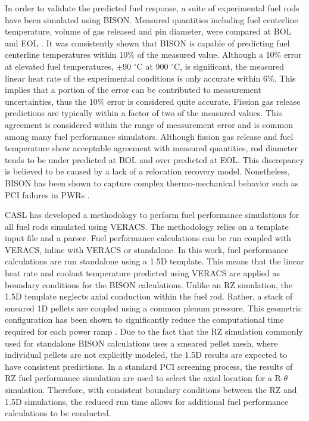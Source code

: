 \documentclass[edeposit,fullpage,11pt]{uiucthesis2009}
\begin{document}
In order to validate the predicted fuel response, a suite of experimental fuel rods have been simulated using BISON.
Measured quantities including fuel centerline temperature, volume of gas released and pin diameter, were compared at \gls{BOL} and \gls{EOL} \cite{williamson_validating_2016}.
It was consistently shown that BISON is capable of predicting fuel centerline temperatures within 10\% of the measured value.
Although a 10\% error at elevated fuel temperatures, $\pm$90 $^\circ$C at 900 $^\circ$C, is significant, the measured linear heat rate of the experimental conditions is only accurate within 6\%. 
This implies that a portion of the error can be contributed to measurement uncertainties, thus the 10\% error is considered quite accurate.
Fission gas release predictions are typically within a factor of two of the measured values.
This agreement is considered within the range of measurement error and is common among many fuel performance simulators.
Although fission gas release and fuel temperature show acceptable agreement with measured quantities, rod diameter tends to be under predicted at \gls{BOL} and over predicted at \gls{EOL}.
This discrepancy is believed to be caused by a lack of a relocation recovery model.
Nonetheless, BISON has been shown to capture complex thermo-mechanical behavior such as PCI failures in PWRs \cite{montgomery_advanced_2014,capps_pci_2017}.

\gls{CASL} has developed a methodology to perform fuel performance simulations for all fuel rods simulated using \gls{VERACS}.
The methodology relies on a template input file and a parser.
Fuel performance calculations can be run coupled with \gls{VERACS}, inline with \gls{VERACS} or standalone.
In this work, fuel performance calculations are run standalone using a 1.5D template.
This means that the linear heat rate and coolant temperature predicted using \gls{VERACS} are applied as boundary conditions for the BISON calculations.
Unlike an RZ simulation, the 1.5D template neglects axial conduction within the fuel rod.
Rather, a stack of smeared 1D pellets are coupled using a common plenum pressure.  
This geometric configuration has been shown to significantly reduce the computational time required for each power ramp \cite{gardner_review_2017}.
Due to the fact that the RZ simulation commonly used for standalone BISON calculations uses a smeared pellet mesh, where individual pellets are not explicitly modeled, the 1.5D results are expected to have consistent predictions.
In a standard \gls{PCI} screening process, the results of RZ fuel performance simulation are used to select the axial location for a R-$\theta$ simulation.
Therefore, with consistent boundary conditions between the RZ and 1.5D simulations, the reduced run time allows for additional fuel performance calculations to be conducted.
\end{document}
